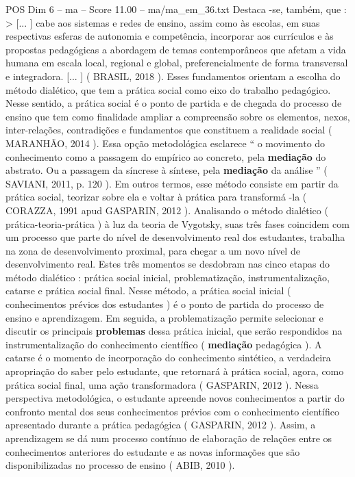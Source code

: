 \begin{textsample}{POS Dim 6 – ma – Score 11.00 – ma/ma\_em\_36.txt}
Destaca -se, também, que : > [... ] cabe aos sistemas e redes de ensino, assim como às escolas, em suas respectivas esferas de autonomia e competência, incorporar aos currículos e às propostas pedagógicas a abordagem de temas contemporâneos que afetam a vida humana em escala local, regional e global, preferencialmente de forma transversal e integradora. [... ] ( BRASIL, 2018 ).
Esses fundamentos orientam a escolha do método dialético, que tem a prática social como eixo do trabalho pedagógico.
Nesse sentido, a prática social é o ponto de partida e de chegada do processo de ensino que tem como finalidade ampliar a compreensão sobre os elementos, nexos, inter-relações, contradições e fundamentos que constituem a realidade social ( MARANHÃO, 2014 ).
Essa opção metodológica esclarece “ o movimento do conhecimento como a passagem do empírico ao concreto, pela \textbf{mediação} do abstrato.
Ou a passagem da síncrese à síntese, pela \textbf{mediação} da análise ” ( SAVIANI, 2011, p. 120 ).
Em outros termos, esse método consiste em partir da prática social, teorizar sobre ela e voltar à prática para transformá -la ( CORAZZA, 1991 apud GASPARIN, 2012 ).
Analisando o método dialético ( prática-teoria-prática ) à luz da teoria de Vygotsky, suas três fases coincidem com um processo que parte do nível de desenvolvimento real dos estudantes, trabalha na zona de desenvolvimento proximal, para chegar a um novo nível de desenvolvimento real.
Estes três momentos se desdobram nas cinco etapas do método dialético : prática social inicial, problematização, instrumentalização, catarse e prática social final.
Nesse método, a prática social inicial ( conhecimentos prévios dos estudantes ) é o ponto de partida do processo de ensino e aprendizagem.
Em seguida, a problematização permite selecionar e discutir os principais \textbf{problemas} dessa prática inicial, que serão respondidos na instrumentalização do conhecimento científico ( \textbf{mediação} pedagógica ).
A catarse é o momento de incorporação do conhecimento sintético, a verdadeira apropriação do saber pelo estudante, que retornará à prática social, agora, como prática social final, uma ação transformadora ( GASPARIN, 2012 ).
Nessa perspectiva metodológica, o estudante apreende novos conhecimentos a partir do confronto mental dos seus conhecimentos prévios com o conhecimento científico apresentado durante a prática pedagógica ( GASPARIN, 2012 ).
Assim, a aprendizagem se dá num processo contínuo de elaboração de relações entre os conhecimentos anteriores do estudante e as novas informações que são disponibilizadas no processo de ensino ( ABIB, 2010 ).

\end{textsample}

